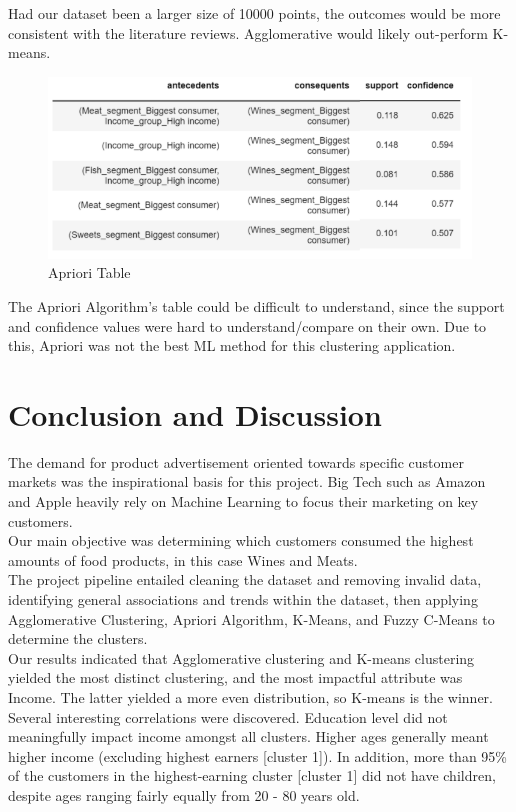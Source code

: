 \documentclass[12pt]{article}
\begin{document}
\noindent Had our dataset been a larger size of 10000 points, the outcomes would be more consistent with the literature reviews. Agglomerative would likely out-perform K-means.\\

\begin{figure}[H]
  \centering
  \includegraphics[width=.5\linewidth]{figures/Apriori_Algorithm.PNG}\hfill
  \caption{Apriori Table}
\end{figure}
\noindent The Apriori Algorithm’s table could be difficult to understand, since the support and confidence values were hard to understand/compare on their own. Due to this, Apriori was not the best ML method for this clustering application.\\

\section{Conclusion and Discussion}
The demand for product advertisement oriented towards specific customer markets was the inspirational basis for this project. Big Tech such as Amazon and Apple heavily rely on Machine Learning to focus their marketing on key customers. \\

\noindent Our main objective was determining which customers consumed the highest amounts of food products, in this case Wines and Meats.\\

\noindent The project pipeline entailed cleaning the dataset and removing invalid data, identifying general associations and trends within the dataset, then applying Agglomerative Clustering, Apriori Algorithm, K-Means, and Fuzzy C-Means to determine the clusters.\\

\noindent Our results indicated that Agglomerative clustering and K-means clustering yielded the most distinct clustering, and the most impactful attribute was Income. The latter yielded a more even distribution, so K-means is the winner.\\

\noindent Several interesting correlations were discovered. Education level did not meaningfully impact income amongst all clusters. Higher ages generally meant higher income (excluding highest earners [cluster 1]). In addition, more than 95\% of the customers in the highest-earning cluster [cluster 1] did not have children, despite ages ranging fairly equally from 20 - 80 years old.\\
\end{document}
